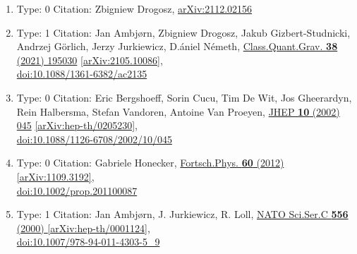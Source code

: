 \documentclass[a4paper,10pt]{article}
\begin{document}
\begin{enumerate}
\begin{enumerate}
  \item Type: 0 Citation: Zbigniew Drogosz, \href{https://arxiv.org/abs/2112.02156}{arXiv:2112.02156}
  \item Type: 1 Citation: Jan Ambjørn, Zbigniew Drogosz, Jakub Gizbert-Studnicki, Andrzej Görlich, Jerzy Jurkiewicz, D.ániel Németh, \href{https://www.doi.org/10.1088/1361-6382/ac2135}{Class.Quant.Grav. {\bf 38} (2021) 195030}  \href{https://arxiv.org/abs/2105.10086}{[arXiv:2105.10086]},\\\href{https://www.doi.org/10.1088/1361-6382/ac2135}{doi:10.1088/1361-6382/ac2135}
  \item Type: 0 Citation: Eric Bergshoeff, Sorin Cucu, Tim De Wit, Jos Gheerardyn, Rein Halbersma, Stefan Vandoren, Antoine Van Proeyen, \href{https://www.doi.org/10.1088/1126-6708/2002/10/045}{JHEP {\bf 10} (2002) 045}  \href{https://arxiv.org/abs/hep-th/0205230}{[arXiv:hep-th/0205230]},\\\href{https://www.doi.org/10.1088/1126-6708/2002/10/045}{doi:10.1088/1126-6708/2002/10/045}
  \item Type: 0 Citation: Gabriele Honecker, \href{https://www.doi.org/10.1002/prop.201100087}{Fortsch.Phys. {\bf 60} (2012) }  \href{https://arxiv.org/abs/1109.3192}{[arXiv:1109.3192]},\\\href{https://www.doi.org/10.1002/prop.201100087}{doi:10.1002/prop.201100087}
  \item Type: 1 Citation: Jan Ambjørn, J. Jurkiewicz, R. Loll, \href{https://www.doi.org/10.1007/978-94-011-4303-5_9}{NATO Sci.Ser.C {\bf 556} (2000) }  \href{https://arxiv.org/abs/hep-th/0001124}{[arXiv:hep-th/0001124]},\\\href{https://www.doi.org/10.1007/978-94-011-4303-5_9}{doi:10.1007/978-94-011-4303-5\_9}

\end{enumerate}
\end{enumerate}
\end{document}
